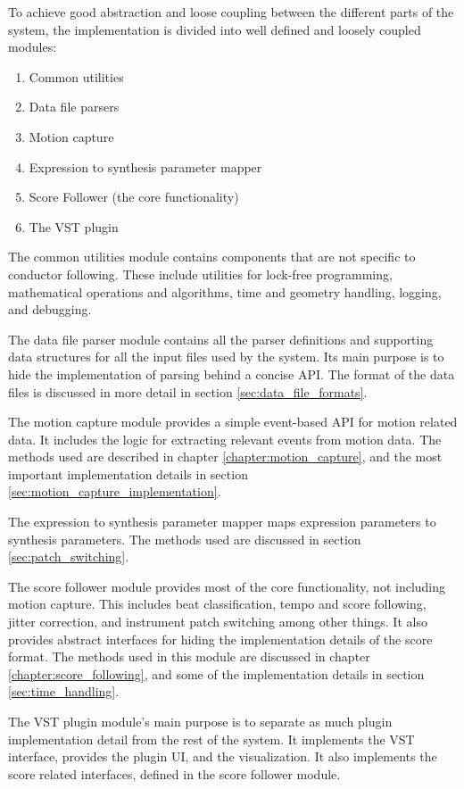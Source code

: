 To achieve good abstraction and loose coupling
between the different parts of the system,
the implementation is divided into 
well defined and loosely coupled modules:
\begin{enumerate}
\item Common utilities
\item Data file parsers
\item Motion capture
\item Expression to synthesis parameter mapper
\item Score Follower (the core functionality)
\item The VST plugin \label{item:last_implementation_module}
\end{enumerate}
The common utilities module contains components
that are not specific to conductor following.
These include utilities for
lock-free programming,
mathematical operations and algorithms,
time and geometry handling,
logging, and debugging.

The data file parser module
contains all the parser definitions
and supporting data structures
for all the input files used by the system.
Its main purpose is to hide the implementation
of parsing behind a concise API.
The format of the data files is discussed in more detail
in section \ref{sec:data_file_formats}.

The motion capture module provides a simple
event-based API for motion related data.
It includes the logic for extracting relevant events from motion data.
The methods used are described in
chapter \ref{chapter:motion_capture},
and the most important implementation details in
section \ref{sec:motion_capture_implementation}.

The expression to synthesis parameter mapper
maps expression parameters to synthesis parameters.
The methods used are discussed in section
\ref{sec:patch_switching}.

The score follower module provides most of the core functionality,
not including motion capture.
This includes
beat classification, tempo and score following, jitter correction,
and instrument patch switching among other things.
It also provides abstract interfaces for 
hiding the implementation details of the score format.
The methods used in this module are discussed
in chapter \ref{chapter:score_following},
and some of the implementation details
in section \ref{sec:time_handling}.

The VST plugin module's main purpose is to
separate as much plugin implementation detail from the rest of the system.
It implements the VST interface,
provides the plugin UI,
and the visualization.
It also implements the score related interfaces,
defined in the score follower module.

